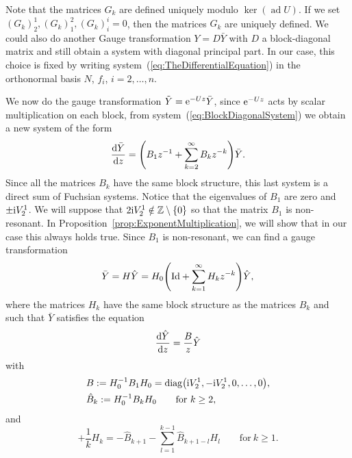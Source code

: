 \documentclass[10pt,a4paper]{amsart}
\numberwithin{equation}{section}
\begin{document}
 \begin{Remark}
 Note that the matrices $G_{k}$ are defined uniquely modulo $\operatorname{ker} ({\operatorname{ad}U})$.
 If we set $(G_{k})^{1}_{2},(G_{k})^{2}_{1},(G_{k})^{i}_{i}=0$, then the matrices $G_{k}$ are uniquely defined. We could also do another Gauge transformation $Y=D\bar{Y}$ with $D$ a block-diagonal matrix and still obtain a system with diagonal principal part. In our case, this choice is fixed by writing system~(\ref{eq:TheDifferentialEquation}) in the orthonormal basis $N$, $f_{i}$, $i=2,\dots,n$.
 \end{Remark}
 We now do the gauge transformation $\tilde{Y}={\rm e}^{-Uz}\bar{Y}$, since ${\rm e}^{-Uz}$ acts by scalar multiplication on each block, from system~(\ref{eq:BlockDiagonalSystem}) we obtain a new system of the form
 \begin{equation}
 \label{eq:IntermidateSystem}
 \frac{{\rm d}\bar{Y}}{{\rm d}z}=\Biggl( B_{1}z^{-1}+\sum_{k=2}^{\infty}B_{k}z^{-k}\Biggr)\bar{Y}.
 \end{equation}
 Since all the matrices $B_{k}$ have the same block structure, this last system is a direct sum of Fuchsian systems. Notice that the eigenvalues of $B_{1}$ are zero and $\pm {\rm i}V^{1}_{2}$. We will suppose that $2{\rm i} V^{1}_{2}\notin\mathbb{Z}\setminus \{ 0 \}$ so that the matrix $B_{1}$ is non-resonant. In Proposition~\ref{prop:ExponentMultiplication}, we will show that in our case this always holds true. Since $B_{1}$ is non-resonant, we can find a gauge transformation
\begin{equation*}
 \bar{Y}=H\hat{Y}=H_{0}\Biggl({\rm Id}+\sum_{k=1}^{\infty}H_{k}z^{-k}\Biggr)\hat{Y},
 \end{equation*}
 where the matrices $H_{k}$ have the same block structure as the matrices $B_{k}$ and such that $\bar{Y}$ satisfies the equation
 \begin{equation*}
 \frac{{\rm d}\hat{Y}}{{\rm d}z}=\frac{B}{z}\hat{Y}
 \end{equation*}
 with
 \begin{align*}
 & B:=H_{0}^{-1}B_{1}H_{0}=\operatorname{diag}\bigl({\rm i}V^{1}_{2},-{\rm i}V^{1}_{2},0,\dots,0\bigr),\\
 & \hat{B}_{k}:=H_{0}^{-1}B_{k}H_{0}\qquad \mathrm{for}\ k\geq2,
 \end{align*}
 and
 \begin{equation*}
 [B,H_{k}]+\frac{1}{k}H_{k}=-\hat{B}_{k+1}-\sum_{l=1}^{k-1}\hat{B}_{k+1-l}H_{l} \qquad \mathrm{for}\ k\geq 1.
 \end{equation*}
\end{document}
